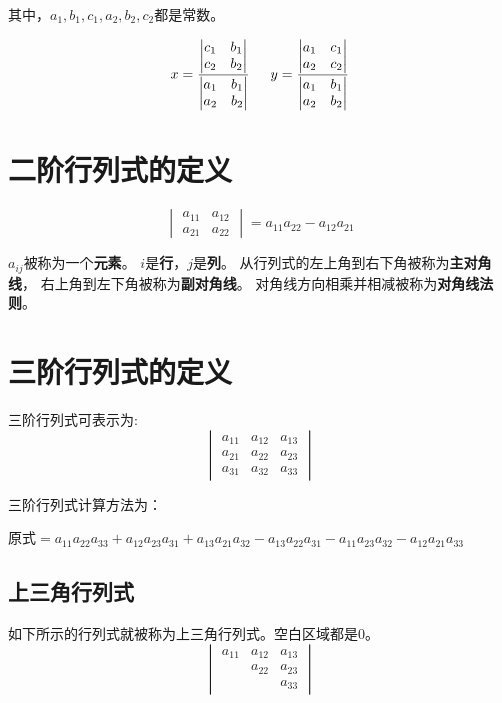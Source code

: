 \documentclass[UTF8, 12pt]{article} %
\begin{document}
其中，$a_1,b_1,c_1,a_2,b_2,c_2$都是常数。


$$
x=\frac{
    \begin{vmatrix}
        c_1 & b_1 \\
        c_2 & b_2
    \end{vmatrix}
}{
    \begin{vmatrix}
        a_1 & b_1 \\
        a_2 & b_2
    \end{vmatrix}
}
\indent
y=\frac{
    \begin{vmatrix}
        a_1 & c_1 \\
        a_2 & c_2
    \end{vmatrix}
}{
    \begin{vmatrix}
        a_1 & b_1 \\
        a_2 & b_2
    \end{vmatrix}
}
$$


\section{二阶行列式的定义}
$$
\begin{vmatrix}
    a_{11}&a_{12}\\
    a_{21}&a_{22}
\end{vmatrix}
=a_{11}a_{22}-a_{12}a_{21}
$$

$a_{ij}$被称为一个\textbf{元素}。
$i$是\textbf{行}，$j$是\textbf{列}。
从行列式的左上角到右下角被称为\textbf{主对角线}，
右上角到左下角被称为\textbf{副对角线}。
对角线方向相乘并相减被称为\textbf{对角线法则}。

\section{三阶行列式的定义}
三阶行列式可表示为:
$$
\begin{vmatrix}
    a_{11}&a_{12}&a_{13}\\
    a_{21}&a_{22}&a_{23}\\
    a_{31}&a_{32}&a_{33}
\end{vmatrix}
$$

三阶行列式计算方法为：

原式$=a_{11}a_{22}a_{33}+a_{12}a_{23}a_{31}+a_{13}a_{21}a_{32}-a_{13}a_{22}a_{31}-a_{11}a_{23}a_{32}-a_{12}a_{21}a_{33}$

\subsection{上三角行列式}
如下所示的行列式就被称为上三角行列式。空白区域都是0。
$$
\begin{vmatrix}
    a_{11}&a_{12}&a_{13}\\
          &a_{22}&a_{23}\\
          &      &a_{33}
\end{vmatrix}
$$
\end{document}
